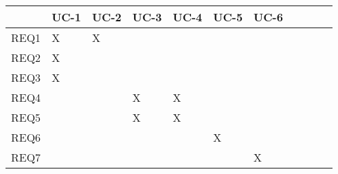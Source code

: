 \documentclass[11pt]{article}
\begin{document}
\begin{center}
\begin{tabular}{|l|l|l|l|l|l|l|l|l|l|l|}
\hline
      & UC-1 & UC-2 & UC-3 & UC-4 & UC-5 & UC-6  \\ \hline
REQ1  & X    &   X   &    &      &      &            \\ \hline
REQ2  & X    &      &      &      &      &            \\ \hline
REQ3  & X    &      &      &      &      &            \\ \hline
REQ4  &      &     &    X  &  X    &      &             \\ \hline
REQ5  &      &     &   X   &  X   &      &             \\ \hline
REQ6  &      &      &      &      &  X   &          \\ \hline
REQ7  &      &      &      &      &     &  X        \\ \hline

\end{tabular}
\end{center}








\end{document}

